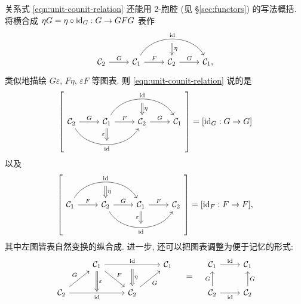 \begin{remark}\label{rem:triangle-identity}
	关系式 \eqref{eqn:unit-counit-relation} 还能用 2-胞腔 (见 \S\ref{sec:functors}) 的写法概括. 将横合成 $\eta G = \eta  \circ \mathrm{id}_G: G \to GFG$ 表作
	\[ \begin{tikzcd}
		\mathcal{C}_2 \arrow[r, "G"] & \mathcal{C}_1 \arrow[r, "F"] \arrow[bend left=60, rr, "\identity", ""' name=I] & \mathcal{C}_2 \arrow[r, "G"] \arrow[Leftarrow, to path= -- (I) \tikztonodes, "\eta"'] & \mathcal{C}_1 ,
	\end{tikzcd} \]
	类似地描绘 $G\varepsilon$, $F\eta$, $\varepsilon F$ 等图表. 则 \eqref{eqn:unit-counit-relation} 说的是
	\[ \left[ \begin{tikzcd}
		\mathcal{C}_2 \arrow[r, "G"] \arrow[bend right=60, rr, "" name=J, "\identity"'] &
		\mathcal{C}_1 \arrow[r, "F"] \arrow[bend left=60, rr, "\identity", ""' name=I] \arrow[Rightarrow, to path= --(J) \tikztonodes, "\varepsilon"'] &
		\mathcal{C}_2 \arrow[r, "G"] \arrow[Leftarrow, to path= -- (I) \tikztonodes, "\eta"'] &
		\mathcal{C}_1 
	\end{tikzcd} \right] = [\identity_G: G \to G] \]
	以及
	\[ \left[ \begin{tikzcd}
		\mathcal{C}_1 \arrow[r, "F"] \arrow[bend left=60, rr, "\identity", ""' name=I] &
		\mathcal{C}_2 \arrow[r, "G"] \arrow[bend right=60, rr, "" name=J, "\identity"'] \arrow[Leftarrow, to path= -- (I) \tikztonodes, "\eta"'] &
		\mathcal{C}_1 \arrow[r, "F"] \arrow[Rightarrow, to path= --(J) \tikztonodes, "\varepsilon"'] &
		\mathcal{C}_2
	\end{tikzcd} \right] = [\identity_F: F \to F], \]
	其中左图皆表自然变换的纵合成. 进一步, 还可以把图表调整为便于记忆的形式:
	\begin{equation*} \begin{tikzcd}
		{} & \mathcal{C}_1 \arrow[rr, "\identity", ""' name=I] \arrow[rd, "F"] \arrow[Rightarrow, d, "\varepsilon"] & & \mathcal{C}_1 \\
		\mathcal{C}_2 \arrow[ru, "G"] \arrow[rr, "\identity"', "" name=J] & {} & \mathcal{C}_2 \arrow[ru, "G"'] \arrow[Leftarrow, to path= -- (I) \tikztonodes, "\eta"'] &
	\end{tikzcd} \quad = \quad
	\begin{tikzcd}
		\mathcal{C}_1 \arrow[r, "\identity"] & \mathcal{C}_1 \\
		\mathcal{C}_2 \arrow[r, "\identity"'] \arrow[u, "G"] & \mathcal{C}_2 \arrow[u, "G"']
	\end{tikzcd} \end{equation*}

\end{remark}
